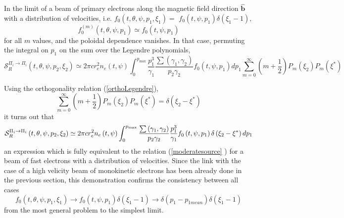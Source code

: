 In the limit of a beam of primary electrons along the magnetic field
direction $\widehat{\mathbf{b}}$ with a distribution of velocities, i.e. $%
f_{0}\left( t,\theta ,\psi ,p_{1},\xi _{1}\right) =$ $f_{0}\left( t,\psi
,p_{1}\right) \delta \left( \xi _{1}-1\right) ,$ 
\begin{equation}
f_{0}^{\left( m\right) }\left( t,\theta ,\psi ,p_{1}\right) \simeq
f_{0}\left( t,\psi ,p_{1}\right)
\end{equation}%
for all $m$ values, and the poloidal dependence vanishes. In that case,
permuting the integral on $p_{1}$ on the sum over the Legendre polynomials, 
\begin{equation}
\mathcal{S}_{R}^{\Pi _{i}\rightarrow \Pi _{i}}\left( t,\theta ,\psi
,p_{2},\xi _{2}\right) \simeq 2\pi cr_{e}^{2}n_{e}\left( t,\psi \right)
\int_{0}^{p_{\max }}\frac{p_{1}^{3}}{\gamma _{1}}\frac{\sum \left( \gamma
_{1},\gamma _{2}\right) }{p_{2}\gamma _{2}}f_{0}\left( t,\psi ,p_{1}\right)
dp_{1}\sum_{m=0}^{\infty }\left( m+\frac{1}{2}\right) P_{m}\left( \xi
_{2}\right) P_{m}\left( \xi ^{\ast }\right)
\end{equation}

Using the orthogonality relation (\ref{orthoLegendre}), 
\begin{equation}
\sum_{m=0}^{\infty }\left( m+\frac{1}{2}\right) P_{m}\left( \xi _{2}\right)
P_{m}\left( \xi ^{\ast }\right) =\delta \left( \xi _{2}-\xi ^{\ast }\right)
\end{equation}%
it turns out that 
\begin{equation}
\mathcal{S}_{R}^{\Pi _{i}\rightarrow \Pi _{i}}\left( t,\theta ,\psi
,p_{2},\xi _{2}\right) \simeq 2\pi cr_{e}^{2}n_{e}\left( t,\psi \right)
\int_{0}^{p_{\max }}\frac{\sum \left( \gamma _{1},\gamma _{2}\right) }{%
p_{2}\gamma _{2}}\frac{p_{1}^{3}}{\gamma _{1}}f_{0}\left( t,\psi
,p_{1}\right) \delta \left( \xi _{2}-\xi ^{\ast }\right) dp_{1}
\end{equation}%
an expression which is fully equivalent to the relation (\ref{moderatesource}%
) for a beam of fast electrons with a distribution of velocities. Since the
link with the case of a high velicity beam of monokinetic electrons has been
already done in the previous section, this demonstration confirms the
consistency between all cases 
\begin{equation}
f_{0}\left( t,\theta ,\psi ,p_{1},\xi _{1}\right) \rightarrow f_{0}\left(
t,\psi ,p_{1}\right) \delta \left( \xi _{1}-1\right) \rightarrow \delta
\left( p_{1}-p_{1mean}\right) \delta \left( \xi _{1}-1\right)
\end{equation}%
from the most general problem to the simplest limit.

